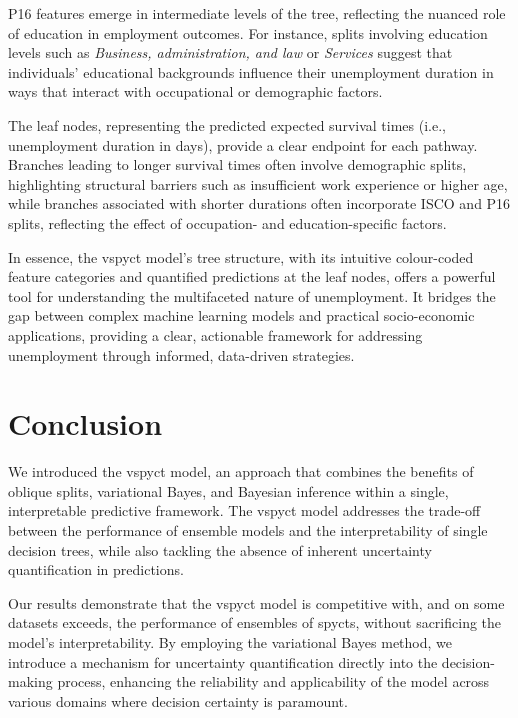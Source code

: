 \documentclass[3p,review,authoryear]{elsarticle}
\begin{document}
P16 features emerge in intermediate levels of the tree, reflecting the nuanced role of education in employment outcomes.
For instance, splits involving education levels such as \textit{Business, administration, and law} or \textit{Services} suggest that individuals’ educational backgrounds influence their unemployment duration in ways that interact with occupational or demographic factors.

The leaf nodes, representing the predicted expected survival times (i.e., unemployment duration in days), provide a clear endpoint for each pathway.
Branches leading to longer survival times often involve demographic splits, highlighting structural barriers such as insufficient work experience or higher age, while branches associated with shorter durations often incorporate ISCO and P16 splits, reflecting the effect of occupation- and education-specific factors.

In essence, the \gls{vspyct} model's tree structure, with its intuitive colour-coded feature categories and quantified predictions at the leaf nodes, offers a powerful tool for understanding the multifaceted nature of unemployment.
It bridges the gap between complex machine learning models and practical socio-economic applications, providing a clear, actionable framework for addressing unemployment through informed, data-driven strategies.


\section{Conclusion}

We introduced the \gls{vspyct} model, an approach that combines the benefits of oblique splits, variational Bayes, and Bayesian inference within a single, interpretable predictive framework.
The \gls{vspyct} model addresses the trade-off between the performance of ensemble models and the interpretability of single decision trees, while also tackling the absence of inherent uncertainty quantification in predictions.

Our results demonstrate that the \gls{vspyct} model is competitive with, and on some datasets exceeds, the performance of ensembles of \glspl{spyct}, without sacrificing the model's interpretability.
By employing the variational Bayes method, we introduce a mechanism for uncertainty quantification directly into the decision-making process, enhancing the reliability and applicability of the model across various domains where decision certainty is paramount.
\end{document}
